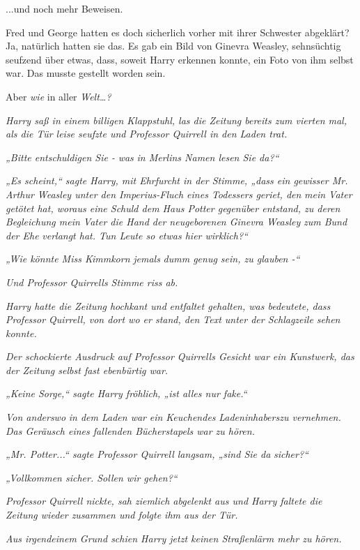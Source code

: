 {...und noch mehr Beweisen.

Fred und George hatten es doch sicherlich vorher mit ihrer Schwester abgeklärt? Ja, natürlich hatten sie das. Es gab ein Bild von Ginevra Weasley, sehnsüchtig seufzend über etwas, dass, soweit Harry erkennen konnte, ein Foto von ihm selbst war. Das musste gestellt worden sein.

Aber \emph{wie} in aller \emph{Welt…?}

\emph{Harry saß in einem billigen Klappstuhl, las die Zeitung bereits zum vierten mal, als die Tür leise seufzte und Professor Quirrell in den Laden trat.}

\emph{„Bitte entschuldigen Sie -} \emph{\emph{was}} \emph{in Merlins Namen lesen Sie da?“}

\emph{„Es scheint,“ sagte Harry, mit Ehrfurcht in der Stimme, „dass ein gewisser Mr. Arthur Weasley unter den Imperius-Fluch eines Todessers geriet, den} \emph{mein Vater getötet hat, woraus eine Schuld dem Haus Potter gegenüber entstand, zu deren Begleichung mein Vater die Hand der neugeborenen Ginevra Weasley} \emph{zum Bund der Ehe} \emph{verlangt hat. Tun Leute so etwas hier wirklich?“}

\emph{„Wie könnte Miss Kimmkorn} \emph{\emph{jemals}} \emph{dumm genug sein, zu glauben -“}

\emph{Und Professor Quirrells Stimme riss ab.}

\emph{Harry hatte die Zeitung hochkant und} \emph{entfaltet gehalten, was bedeutete, dass Professor Quirrell, von dort wo er stand, den Text unter der Schlagzeile sehen konnte.}

\emph{Der schockierte Ausdruck auf Professor Quirrells Gesicht war ein Kunstwerk, das} \emph{der Zeitung selbst fast ebenbürtig war.}

\emph{„Keine Sorge,“ sagte Harry fröhlich, „ist alles nur fake.“}

\emph{Von anderswo} \emph{in dem Laden war} \emph{ein Keuchendes} \emph{Ladeninhaberszu vernehmen. Das Geräusch eines fallenden Bücherstapels war zu hören.}

\emph{„Mr. Potter...“ sagte Professor Quirrell langsam, „sind Sie da} \emph{\emph{sicher?}“}

\emph{„Vollkommen sicher. Sollen wir gehen?“}

\emph{Professor Quirrell nickte, sah ziemlich abgelenkt aus und Harry faltete die Zeitung wieder zusammen und folgte ihm aus der Tür.}

\emph{Aus irgendeinem Grund schien Harry jetzt keinen Straßenlärm mehr zu hören.}

}
